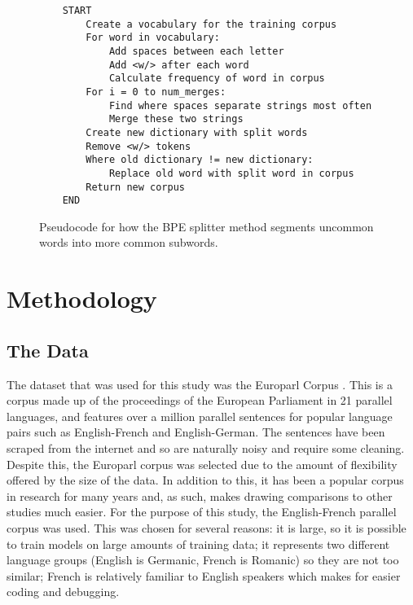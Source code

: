 \documentclass[11pt]{article}
\begin{document}
\begin{figure}[h]
\begin{verbatim}
    START
        Create a vocabulary for the training corpus
        For word in vocabulary:
            Add spaces between each letter
            Add <w/> after each word
            Calculate frequency of word in corpus
        For i = 0 to num_merges:
            Find where spaces separate strings most often
            Merge these two strings
        Create new dictionary with split words
        Remove <w/> tokens
        Where old dictionary != new dictionary:
            Replace old word with split word in corpus
        Return new corpus
    END
\end{verbatim}
\caption{Pseudocode for how the BPE splitter method segments uncommon words into more common subwords.}
\label{table:pseudocode2}
\end{figure}

\newpage

\section{Methodology}

\subsection{The Data}

The dataset that was used for this study was the Europarl Corpus \citep{koehn2005europarl}. This is a corpus made up of the proceedings of the European Parliament in 21 parallel languages, and features over a million parallel sentences for popular language pairs such as English-French and English-German. The sentences have been scraped from the internet and so are naturally noisy and require some cleaning. Despite this, the Europarl corpus was selected due to the amount of flexibility offered by the size of the data. In addition to this, it has been a popular corpus in research for many years and, as such, makes drawing comparisons to other studies much easier. For the purpose of this study, the English-French parallel corpus was used. This was chosen for several reasons: it is large, so it is possible to train models on large amounts of training data; it represents two different language groups (English is Germanic, French is Romanic) so they are not too similar; French is relatively familiar to English speakers which makes for easier coding and debugging.

\bigskip
\end{document}

